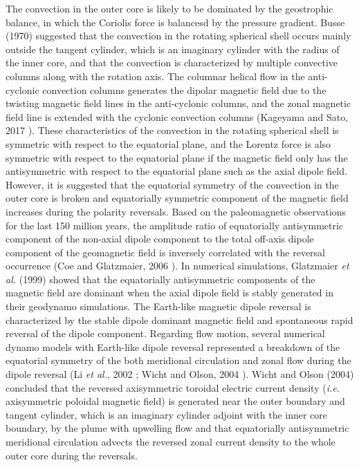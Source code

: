 The convection in the outer core is likely to be dominated by the geostrophic balance, {\color{red} in which the Coriolis force is balancesd by the pressure gradient.} 
Busse (1970) \cite{Busse:1970} suggested that the convection in the rotating spherical shell occurs mainly outside the tangent cylinder, which is an imaginary cylinder with the radius of the inner core, and that the convection is characterized by multiple convective columns along with the rotation axis. 
The columnar helical flow in the anti-cyclonic convection columns generates the dipolar magnetic field due to the twisting magnetic field lines in the anti-cyclonic columns, and the zonal magnetic field line is extended with the cyclonic convection columns (Kageyama and Sato, 2017 \cite{Kageyama:97c}). 
These characteristics of the convection in the rotating spherical shell is symmetric with respect to the equatorial plane, and the Lorentz force is also symmetric with respect to the equatorial plane if the magnetic field only has the antisymmetric with respect to the equatorial plane such as the axial dipole field.
However, it is suggested that the equatorial symmetry of the convection in the outer core is broken and equatorially symmetric component of the magnetic field increases during the polarity reversals. 
Based on the paleomagnetic observations for the last 150 million years, the amplitude ratio of equatorially antisymmetric component of the non-axial dipole component to the total off-axis dipole component of the geomagnetic field is inversely correlated with the reversal occurrence (Coe and Glatzmaier, 2006 \cite{Coe:2006}). 
In numerical simulations, Glatzmaier {\it et al.} (1999) \cite{Glatzmaier:1999} showed that the equatorially antisymmetric components of the magnetic field are dominant when the axial dipole field is stably generated in their geodynamo simulations. 
The Earth-like magnetic dipole reversal is characterized by the stable dipole dominant magnetic field and spontaneous rapid reversal of the dipole component. 
Regarding flow motion, several numerical dynamo models with Earth-like dipole reversal represented a breakdown of the equatorial symmetry of the both meridional circulation and zonal flow  during the dipole reversal (Li {\it et al.}, 2002 \cite{Li:2002}; Wicht and Olson, 2004 \cite{Wicht:2004}).
Wicht and Olson (2004) \cite{Wicht:2004} concluded that the reversed axisymmetric toroidal electric current density ({\it i.e.} axisymmetric poloidal magnetic field) is generated near the outer boundary and tangent cylinder, which is an imaginary cylinder adjoint with the inner core boundary, by the plume with upwelling flow and that equatorially antisymmetric meridional circulation advects the reversed zonal current density to the whole outer core during the reversals.

